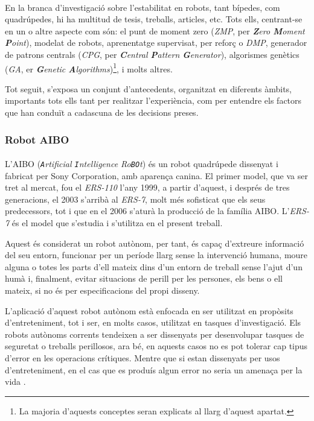 \documentclass[12pt,a4paper,final,twoside]{article}
\begin{document}
\paragraph{}En la branca d'investigació sobre l'estabilitat en robots, tant bípedes, com quadrúpedes, hi ha multitud de tesis, treballs, articles, etc. Tots ells, centrant-se en un o altre aspecte com són: el punt de moment zero (\textit{ZMP}, per \textit{\textbf{Z}ero \textbf{M}oment \textbf{P}oint}), modelat de robots, aprenentatge supervisat, per reforç o \textit{DMP}, generador de patrons centrals (\textit{CPG}, per \textit{\textbf{C}entral \textbf{P}attern \textbf{G}enerator}), algorismes genètics (\textit{GA}, er \textit{\textbf{G}enetic \textbf{A}lgorithms})\footnote{La majoria d'aquests conceptes seran explicats al llarg d'aquest apartat.}, i molts altres.

Tot seguit, s'exposa un conjunt d'antecedents, organitzat en diferents àmbits, importants tots ells tant per realitzar l'experiència, com per entendre els factors que han conduït a cadascuna de les decisions preses.


\subsubsection{Robot AIBO}
\label{AIBO}

\paragraph{}L'AIBO (\textit{\texttt{A}rtificial \texttt{I}ntelligence Ro\texttt{BO}t}) és un robot quadrúpede dissenyat i fabricat per Sony Corporation, amb aparença canina. El primer model, que va ser tret al mercat, fou el \textit{ERS-110} l'any 1999, a partir d'aquest, i després de tres generacions, el 2003 s'arribà al \textit{ERS-7}, molt més sofisticat que els seus predecessors, tot i que en el 2006 s'aturà la producció de la família AIBO. L'\textit{ERS-7} és el model que s'estudia i s'utilitza en el present treball.

Aquest és considerat un robot autònom, per tant, és capaç d'extreure informació del seu entorn, funcionar per un període llarg sense la intervenció humana, moure alguna o totes les parts d'ell mateix dins d'un entorn de treball sense l'ajut d'un humà i, finalment, evitar situacions de perill per les persones, els bens o ell mateix, si no és per especificacions del propi disseny.

L'aplicació d'aquest robot autònom està enfocada en ser utilitzat en propòsits d'entreteniment, tot i ser, en molts casos, utilitzat en tasques d'investigació. Els robots autònoms corrents tendeixen a ser dissenyats per desenvolupar tasques de seguretat o treballs perillosos, ara bé, en aquests casos no es pot tolerar cap tipus d'error en les operacions crítiques. Mentre que si estan dissenyats per usos d'entreteniment, en el cas que es produís algun error no seria un amenaça per la vida \cite{Fujita2000}.
\end{document}
